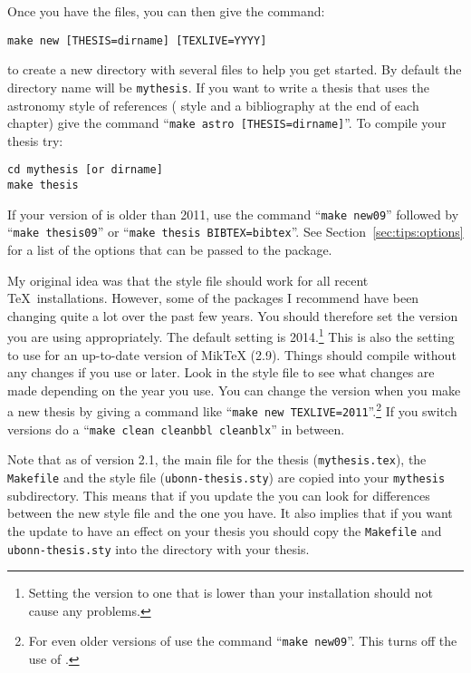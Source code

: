 \par\noindent
Once you have the files, you can then give the command:
\begin{verbatim}
make new [THESIS=dirname] [TEXLIVE=YYYY]
\end{verbatim}
to create a new directory with several files to help you get
started. By default the directory name will be \texttt{mythesis}.
If you want to write a thesis that uses the astronomy style of references
( style and a bibliography at the end of each chapter)
give the command \enquote{\texttt{make astro [THESIS=dirname]}}.
To compile your thesis try:
\begin{verbatim}
cd mythesis [or dirname]
make thesis
\end{verbatim}
If your version of \TeXLive is older than 2011, use the command \enquote{\texttt{make new09}}
followed by \enquote{\texttt{make thesis09}}
or \enquote{\texttt{make thesis BIBTEX=bibtex}}.
See Section~\ref{sec:tips:options} for a list of the options that can be passed to the package.

My original idea was that the style file should work for all recent
\TeX\ installations.  However, some of the packages I recommend have
been changing quite a lot over the past few years. 
You should therefore set the \TeXLive version you are using appropriately.
The default setting is 2014.\footnote{%
Setting the \TeXLive version to one that is lower than your installation should not cause any problems.}
This is also the setting to use for an up-to-date version of MikTeX (2.9).
Things should compile without any changes if you use  or later.
Look in the style file to see what changes are made depending on the year you use.
You can change the \TeXLive version when you make a new thesis 
by giving a command like \enquote{\texttt{make new TEXLIVE=2011}}.\footnote{%
For even older versions of \TeXLive use the command \enquote{\texttt{make new09}}.
This turns off the use of .}
If you switch \TeXLive versions do a
\enquote{\texttt{make clean cleanbbl cleanblx}} in between.

Note that as of version 2.1, the main file for the thesis
(\texttt{mythesis.tex}), the \texttt{Makefile} and the style file
(\texttt{ubonn-thesis.sty}) are copied into your \texttt{mythesis}
subdirectory. This means that if you update the 
you can look for differences between the new style file and the one
you have. It also implies that if you want the update to have an
effect on your thesis you should copy the \texttt{Makefile} and
\texttt{ubonn-thesis.sty} into the directory with your thesis.

